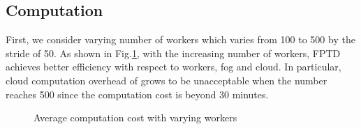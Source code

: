 \documentclass[conference,a4paper]{IEEEtran}
\begin{document}
    \subsection{Computation}
    First, we consider varying number of workers which varies from 100 to 500 by the stride of 50.  As shown in Fig.\ref{workers}, with the increasing number of workers, FPTD achieves better efficiency with respect to workers, fog and cloud. In particular, cloud computation overhead of \cite{rtpt} grows to be unacceptable when the number reaches 500 since the computation cost is beyond 30 minutes.
    \begin{figure}[!ht]
        \centering
        \caption{Average computation cost with varying workers}
        \label{workers}
    \end{figure}
\end{document}
